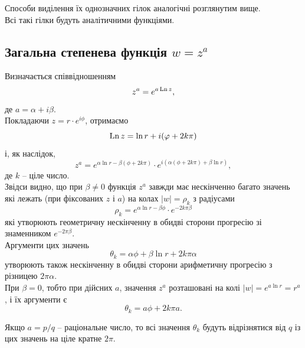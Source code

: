 Способи виділення їх однозначних гілок аналогічні розглянутим вище. \\

Всі такі гілки будуть аналітичними функціями.

\subsection{Загальна степенева функція $w = z^a$}

Визначається співвідношенням
\begin{equation}
	\label{eq:3.5.1}
	z^a = e^{a \operatorname{Ln} z},
\end{equation}
де $a = \alpha + i \beta$. \\

Покладаючи $z = r \cdot e^{i \phi}$, отримаємо
\begin{equation}
	\label{eq:3.5.2}
	\operatorname{Ln} z = \ln r + i (\varphi + 2 k \pi)
\end{equation}
 і, як наслідок,
\begin{equation}
	\label{eq:3.5.3}
	z^a = e^{\alpha \ln r - \beta (\phi + 2 k \pi)} \cdot e^{i (\alpha (\phi + 2 k \pi) + \beta \ln r)},
\end{equation}
де $k$ -- ціле число. \\

Звідси видно, що при $\beta \ne 0$ функція $z^a$ завжди має нескінченно багато значень які лежать (при фіксованих $z$ і $a$) на колах $|w| = \rho_k$ з радіусами
\begin{equation}
	\label{eq:3.5.4}
	\rho_k = e^{\alpha \ln r - \beta \phi} \cdot e^{-2 k \pi \beta}
\end{equation}
які утворюють геометричну нескінченну в обидві сторони прогресію зі знаменником $e^{-2 \pi \beta}$. \\

Аргументи цих значень
\begin{equation}
	\label{eq:3.5.5}
	\theta_k = \alpha \phi + \beta \ln r + 2 k \pi \alpha
\end{equation}
утворюють також нескінченну в обидві сторони арифметичну прогресію з різницею $2 \pi \alpha$. \\

При $\beta = 0$, тобто при дійсних $a$, значення $z^a$ розташовані на колі $|w| = e^{a \ln r} = r^a$, і їх аргументи є
\begin{equation}
	\label{eq:3.5.6}
	\theta_k = a \phi + 2 k \pi a.
\end{equation}

Якщо $a = p / q$ -- раціональне число, то всі значення $\theta_k$ будуть відрізнятися від $q$ із цих значень на ціле кратне $2 \pi$. \\


